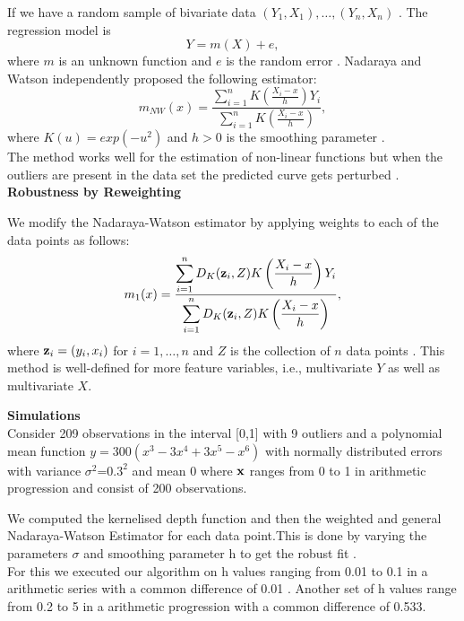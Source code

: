 \documentclass[11pt]{article}
\newcommand{\xvec}{\mbox{\bf x}}
\newcommand{\zvec}{\mbox{\bf z}}
\begin{document}
\begin{flushleft}
If we have a random sample of bivariate data $(Y_1,X_1),\ldots,(Y_n,X_n)$ . The regression model is 
$$Y = m(X) + e,$$ 
where $m$ is an unknown function and $e$ is the random error . Nadaraya and Watson independently proposed the following estimator: 
$$m_{NW}(x)=\frac{\displaystyle{ \sum\limits_{i=1}^n K \left( \frac{X_i-x}{h} \right) Y_i}}{\displaystyle{ \sum\limits_{i=1}^n K \left( \frac{X_i-x}{h}\right )}},$$
where $K(u)=exp(-u^2)$ and $h>0$ is the smoothing parameter .\\
The method works well for the estimation of non-linear functions but when the outliers are present in the data set the predicted curve gets perturbed .\\
\vspace{0.1in}
\textbf{Robustness by Reweighting}
\vspace{0.1in}

We modify the Nadaraya-Watson estimator by applying weights to each of the data points as follows:
$$m_{1}(x)= \frac{\displaystyle{ \sum\limits_{i=1}^n D_K(\zvec_i,Z) K\left( \frac{X_i-x}{h} \right) Y_i}}{\displaystyle{ \sum\limits_{i=1}^n D_K(\zvec_i,Z) K\left( \frac{X_i-x}{h}\right )}},$$
where $\zvec_i=(y_i,x_i)$ for $i=1,\ldots,n$ and $Z$ is the collection of $n$ data points . 
This method is well-defined for more feature variables, i.e., multivariate $Y$ as well as multivariate $X$.

\vspace{0.9in}
\textbf{Simulations}
\vspace{0.1in}
\\
Consider 209 observations in the interval [0,1] with 9 outliers  and a polynomial mean function  $y=300(x^3-3x^4+3x^5-x^6)$ with normally distributed errors with variance $\sigma^2$=$0.3^2$ and mean 0 where
$\xvec$ ranges from 0 to 1 in arithmetic progression and consist of 200 observations.



  
We computed  the kernelised depth function and then the weighted and general Nadaraya-Watson Estimator   for each data point.This is done by varying the parameters $\sigma$ and smoothing parameter h to get the robust fit .\\
\vspace{0.1in}
 For this we executed our algorithm on h values ranging from 0.01 to 0.1 in a arithmetic series with a common difference of 0.01 . Another set of h values range from 0.2 to 5 in a arithmetic progression with a common difference of 0.533.

\vspace{0.1in}




\end{flushleft}
\end{document}
